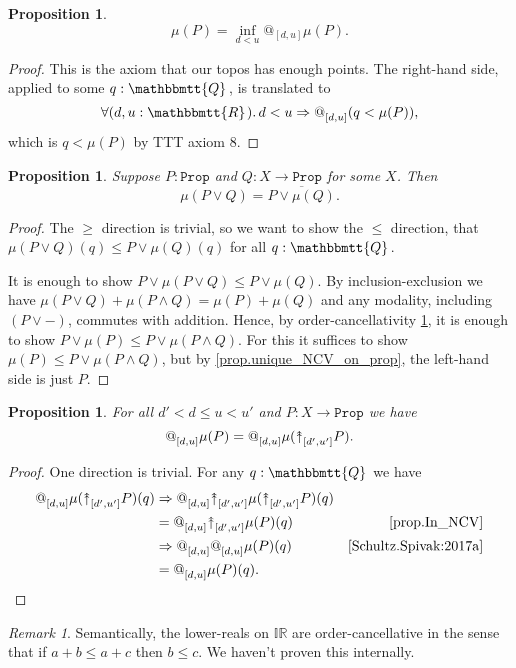 \documentclass[11pt, oneside, article]{memoir}
\makeatletter
\theoremstyle{plain}
\newtheorem{proposition}[theorem]{Proposition}
\theoremstyle{definition}
\theoremstyle{remark}
\newtheorem{remark}[theorem]{Remark}
\newcommand{\const}[1]{\mathtt{#1}}
\newcommand{\ol}[1]{\overline{#1}}
\newcommand{\internal}[1]{\raisebox{-.03ex}{$\mathbbmtt{#1}$}}
\newcommand{\hs}{\hspace{1.1pt}}
\newcommand{\IR}{\mathbb{IR}} %
\newcommand{\tQQ}{\internal{Q}\hs}
\newcommand{\tRR}{\internal{R}\hs}
\newcommand{\Prop}{\const{Prop}}
\newcommand{\AtSymbol}{{@}}
\newcommand{\InSymbol}{{\upclose}}%
\newcommand{\At}[2][]{\AtSymbol^{#1}_{#2}}
\newcommand{\In}[2][]{\InSymbol^{#1}_{#2}}
\newcommand{\upclose}{{\rotatebox[origin=c]{90}{$\twoheadrightarrow$}}}
\newcommand{\imp}{\Rightarrow}
\makeatother
\begin{document}
\begin{proposition}
\[\mu(P)=\inf_{d< u}\At{[d,u]}\mu(P).\]
\end{proposition}
\begin{proof}
This is the axiom that our topos has enough points. The right-hand side, applied to some $q:\tQQ$, is translated to
\[\forall(d,u:\tRR)\ldotp d<u\imp\At{[d,u]}(q<\mu(P)),\]
which is $q<\mu(P)$ by TTT axiom 8.
\end{proof}

\begin{proposition}\label{prop.valuations_OR}
Suppose $P:\Prop$ and $Q:X\to\Prop$ for some $X$. Then
\[\mu(P\vee Q)=\ol{P\vee\mu(Q)}.\]
\end{proposition} 
\begin{proof}
The $\geq$ direction is trivial, so we want to show the $\leq$ direction, that $\mu(P\vee Q)(q)\leq P\vee\mu(Q)(q)$ for all $q:\tQQ$.

It is enough to show $P\vee\mu(P\vee Q)\leq P\vee\mu(Q)$. By inclusion-exclusion we have $\mu(P\vee Q)+\mu(P\wedge Q)=\mu(P)+\mu(Q)$ and any modality, including $(P\vee-)$, commutes with addition. Hence, by order-cancellativity \cref{rem.order_canc}, it is enough to show $P\vee\mu(P)\leq P\vee\mu(P\wedge Q)$.
For this it suffices to show $\mu(P)\leq P\vee\mu(P\wedge Q)$, but by \cref{prop.unique_NCV_on_prop}, the left-hand side is just $P$.
\end{proof}


\begin{proposition}
For all $d'<d\leq u<u'$ and $P\colon X\to\Prop$ we have
\[\At{[d,u]}\mu(P)=\At{[d,u]}\mu(\In{[d',u']}P).\]
\end{proposition}
\begin{proof}
One direction is trivial. For any $q:\tQQ$ we have
\begin{align*}
	\At{[d,u]}\mu(\In{[d',u']}P)(q)
	&\imp\At{[d,u]}\In{[d',u']}\mu(\In{[d',u']}P)(q)\\
	&=\At{[d,u]}\In{[d',u']}\mu(P)(q)&\text{\cref{prop.In_NCV}}\\
	&\imp\At{[d,u]}\At{[d,u]}\mu(P)(q)&\text{\cite[Prop 5.39]{Schultz.Spivak:2017a}}\\	
	&=\At{[d,u]}\mu(P)(q).
\end{align*}
\end{proof}

\begin{remark}\label{rem.order_canc}
Semantically, the lower-reals on $\IR$ are order-cancellative in the sense that if $a+b\leq a+c$ then $b\leq c$. We haven't proven this internally.
\end{remark}
\end{document}
